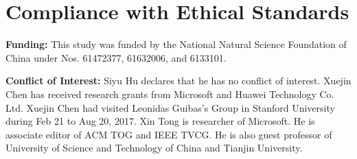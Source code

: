 





\section*{Compliance with Ethical Standards}
\noindent \textbf{Funding:} This study was funded by the National Natural Science Foundation of China under Nos. 61472377, 61632006, and 6133101.

\noindent \textbf{Conflict of Interest:} Siyu Hu declares that he has no conflict of interest.
Xuejin Chen has received research grants from Microsoft and Huawei Technology Co. Ltd. Xuejin Chen had visited Leonidas Guibas’s Group in Stanford University during Feb 21 to Aug 20, 2017.
Xin Tong is researcher of Microsoft.
He is associate editor of ACM TOG and IEEE TVCG. He is also guest professor of University of Science and Technology of China and Tianjin University.



%

%
%



